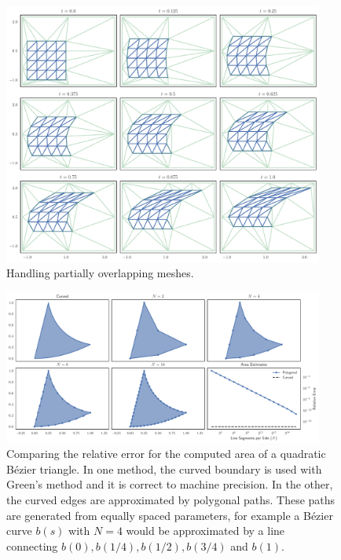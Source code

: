 \begin{figure}
  \includegraphics[width=0.9375\textwidth]
                  {../images/curved-mesh/mesh_distortion_ext.pdf}
  \centering
  \caption{Handling partially overlapping meshes.}
  \label{fig:mesh-distortion-ext}
\end{figure}

\begin{figure}
  \includegraphics[width=0.9375\textwidth]
                  {../images/curved-mesh/polygon_vs_curved.pdf}
  \centering
  \caption{Comparing the relative error for the computed area of a quadratic
    B\'{e}zier triangle. In one method, the curved boundary is used with
    Green's method and it is correct to machine precision. In the other,
    the curved edges are approximated by polygonal paths. These paths are
    generated from equally spaced parameters, for example a B\'{e}zier curve
    \(b(s)\) with \(N = 4\) would be approximated by a line connecting
    \(b(0), b(1/4), b(1/2), b(3/4)\) and \(b(1)\).}
  \label{fig:polygon-vs-curved}
\end{figure}

